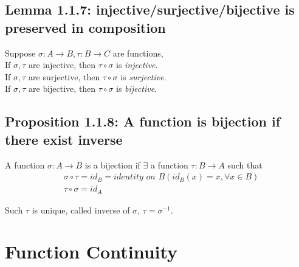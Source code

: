 \documentclass[11pt]{elegantbook}
\begin{document}
\subsection{Lemma 1.1.7: injective/surjective/bijective is preserved in composition}
\begin{lemma}[Lemma 1.1.7]
    Suppose $\sigma:A \rightarrow B, \tau: B \rightarrow C$ are functions,\\
    If $\sigma, \tau$ are injective, then $\tau\circ\sigma$ is \textit{injective}.\\
    If $\sigma, \tau$ are surjective, then $\tau\circ\sigma$ is \textit{surjective}.\\
    If $\sigma, \tau$ are bijective, then $\tau\circ\sigma$ is \textit{bijective}.
\end{lemma}

\subsection{Proposition 1.1.8: A function is bijection if there exist inverse}
\begin{proposition}[Proposition 1.1.8]
    A function $\sigma:A \rightarrow B$ is a bijection if $\exists$ a function $\tau:B \rightarrow A $ such that
    \begin{equation}
        \begin{aligned}
            &\sigma\circ\tau=id_B=\textit{identity on }B(id_B(x)=x, \forall x\in B)\\
            &\tau\circ\sigma=id_A
        \end{aligned}
        \nonumber
    \end{equation}
\end{proposition}
Such $\tau$ is unique, called inverse of $\sigma$, $\tau=\sigma^{-1}$.

\section{Function Continuity}
\end{document}
